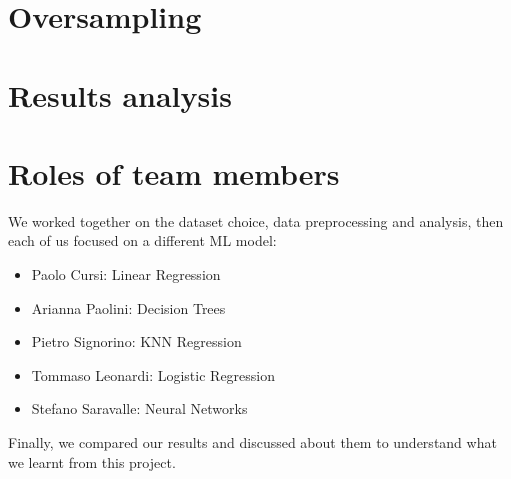 \documentclass{article}
\begin{document}
\section{Oversampling}
\label{sec:oversamp}
\section{Results analysis}
\section{Roles of team members}
We worked together on the dataset choice, data preprocessing and analysis, then each of us focused on a different ML model: 
\begin{itemize}
    \item Paolo Cursi: Linear Regression
    \item Arianna Paolini: Decision Trees
    \item Pietro Signorino: KNN Regression
    \item Tommaso Leonardi: Logistic Regression
    \item Stefano Saravalle: Neural Networks
\end{itemize}
Finally, we compared our results and discussed about them to understand what we learnt from this project.



\end{document}
